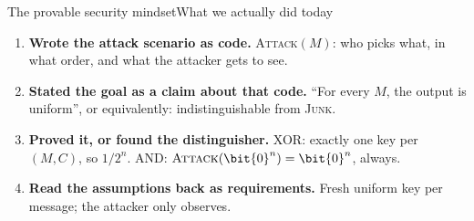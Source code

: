 \ifdefined\PRESENTATION\else\PassOptionsToClass{handout}{beamer}\fi\documentclass[aspectratio=169, lualatex]{beamer}
\begin{document}
\begin{frame}{The provable security mindset}{What we actually did today}
	\begin{enumerate}[<+->]
		\item \textbf{Wrote the attack scenario as code.} \textsc{Attack}$(M)$: who picks what, in what order, and what the attacker gets to see.
		\item \textbf{Stated the goal as a claim about that code.} ``For every $M$, the output is uniform'', or equivalently: indistinguishable from \textsc{Junk}.
		\item \textbf{Proved it, or found the distinguisher.} XOR: exactly one key per $(M, C)$, so $1/2^n$. AND: $\textsc{Attack}(\bit{0}^n) = \bit{0}^n$, always.
		\item \textbf{Read the assumptions back as requirements.} Fresh uniform key per message; the attacker only observes.
	\end{enumerate}
	\vspace{0.5em}
\end{frame}

\begin{frame}[plain]
	\titlepage
\end{frame}
\end{document}
